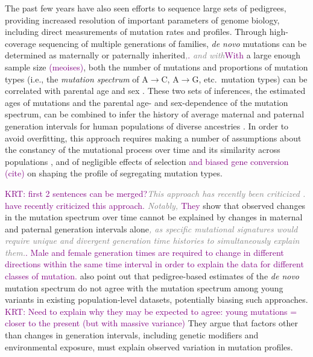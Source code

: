 \documentclass[]{article}
\newcommand{\krtcomment}[1]{{\textcolor{purple}{KRT: #1}}}
\newcommand{\krtedit}[2]{{\emph{\textcolor{gray}{#1}}}{\textcolor{purple}{#2}}}
\begin{document}
The past few years have also seen efforts to sequence large sets of pedigrees,
providing increased resolution of important parameters of genome biology,
including direct measurements of mutation rates and profiles. Through
high-coverage sequencing of multiple generations of families, \emph{de novo}
mutations can be determined as maternally or paternally inherited\krtedit{,}{.}
\krtedit{and with}{With} a
large enough sample size \krtedit{}{(meoises)}, both the number of mutations and proportions of
mutation types (i.e., the \emph{mutation spectrum} of A$\rightarrow$C,
A$\rightarrow$G, etc.\ mutation types) can be correlated with parental age and
sex \citep{jonsson2017parental,halldorsson2019characterizing}.  These two sets
of inferences, the estimated ages of mutations and the parental age- and
sex-dependence of the mutation spectrum, can be combined to infer the history
of average maternal and paternal generation intervals for human populations of
diverse ancestries \citep{macia2021different,wang2023human}. In order to avoid
overfitting, this approach requires making a number of assumptions about the
constancy of the mutational process over time and its similarity across
populations \citep{harris2015evidence,mathieson2017differences,harris2017rapid,
dewitt2021nonparametric}, and of negligible effects of selection
\krtedit{}{and biased gene conversion (cite)} on shaping the
profile of segregating mutation types.

\krtcomment{first 2 sentences can be merged?}\krtedit{This approach has recently been criticized \citep{gao2022limited}.}
{\cite{gao2022limited} have recently criticized this approach.}
\krtedit{Notably,
\citet{gao2022limited}}{They} show that observed changes in the mutation spectrum over
time cannot be explained by changes in maternal and paternal generation
intervals alone\krtedit{, as specific mutational signatures would require unique and
divergent generation time histories to simultaneously explain them.}{. Male and female generation
times are required to change in different directions within the same time interval in
order to explain the data for different classes of mutation.}
\citet{gao2022limited} also point out that pedigree-based estimates of the
\emph{de novo} mutation spectrum do not agree with the mutation spectrum among
young variants in existing population-level datasets, potentially biasing such
approaches. \krtcomment{Need to explain why they may be expected to agree: young mutations = closer to the present (but with massive variance)}
They argue that factors other than changes in generation intervals,
including genetic modifiers and environmental exposure, must explain observed
variation in mutation profiles.
\end{document}

